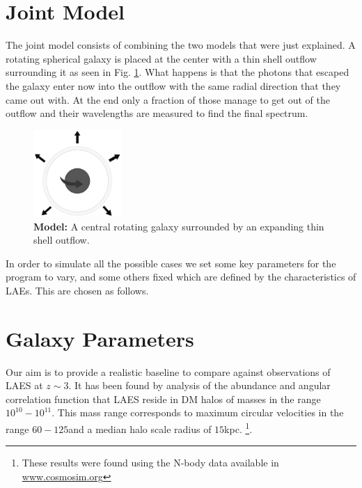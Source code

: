 \section{Joint Model}

The joint model consists of combining the two models that were just explained. A rotating spherical galaxy is placed at the center with a thin shell outflow surrounding it as seen in Fig. \ref{fig:model}. What happens is that the photons that escaped the galaxy enter now into the outflow with the same radial direction that they came out with. At the end only a fraction of those manage to get out of the outflow and their wavelengths are measured to find the final spectrum. \\

\begin{figure}[h!]
	\begin{center}
		\includegraphics[width=0.3\textwidth]{./figures/model.png}
	\end{center}
	\caption{\textbf{Model:} A central rotating galaxy surrounded by an expanding thin shell outflow.}
	\label{fig:model}
\end{figure}

In order to simulate all the possible cases we set some key parameters for the program to vary, and some others fixed which are defined by the characteristics of LAEs. This are chosen as follows.\\

\section{Galaxy Parameters}

Our aim is to provide a realistic baseline to compare against observations of LAES at $z\sim 3$. It has been found by analysis of the abundance and angular correlation function that LAES reside in DM halos of masses in the range $10^{10}-10^{11}$\Msun \cite{WalkerSoler2012}. This mass range corresponds to maximum circular velocities in the range $60-125$\kms and a median halo scale radius of $15$kpc.  \footnote{These results were found using the  N-body data available in \url{www.cosmosim.org}}. \\

